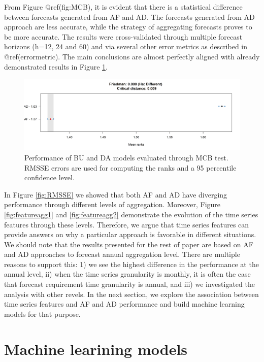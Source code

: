 \documentclass[]{elsarticle} %
\begin{document}
From Figure @ref(fig:MCB), it is evident that there is a statistical
difference between forecasts generated from AF and AD. The forecasts
generated from AD approach are less accurate, while the strategy of
aggregating forecasts proves to be more accurate. The results were
cross-validated through multiple forecast horizons (h=12, 24 and 60) and
via several other error metrics as described in @ref(errormetric). The
main conclusions are almost perfectly aligned with already demonstrated
results in Figure \ref{fig:MCB}.

\begin{figure}[H]

{\centering \includegraphics[width=1\linewidth]{img/300dpi/Fig_MCB} 

}

\caption{Performance of BU and DA models evaluated through MCB test. RMSSE errors are used for computing the ranks and a 95 percentile confidence level.}\label{fig:MCB}
\end{figure}

In Figure \ref{fig:RMSSE} we showed that both AF and AD have diverging
performance through different levels of aggregation. Moreover, Figure
\ref{fig:featureagg1} and \ref{fig:featureagg2} demonstrate the
evolution of the time series features through these levels. Therefore,
we argue that time series features can provide answers on why a
particular approach is favorable in different situations. We should note
that the results presented for the rest of paper are based on AF and AD
approaches to forecast annual aggregation level. There are multiple
reasons to support this: 1) we see the highest difference in the
performance at the annual level, ii) when the time series granularity is
monthly, it is often the case that forecast requirement time granularity
is annual, and iii) we investigated the analysis with other revels. In
the next section, we explore the association between time series
features and AF and AD performance and build machine learning models for
that purpose.

\hypertarget{ml}{%
\section{Machine learining models}\label{ml}}
\end{document}
